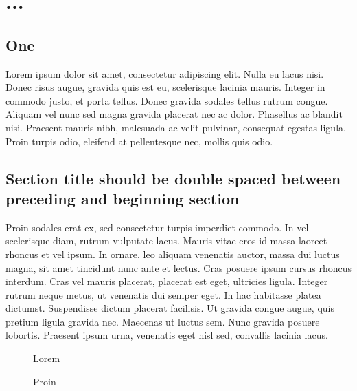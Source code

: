 \chapter{...}	%

\section{One}
Lorem ipsum dolor sit amet, consectetur adipiscing elit. Nulla eu lacus nisi. Donec risus augue, gravida quis est eu, scelerisque lacinia mauris. Integer in commodo justo, et porta tellus. Donec gravida sodales tellus rutrum congue. Aliquam vel nunc sed magna gravida placerat nec ac dolor. Phasellus ac blandit nisi. Praesent mauris nibh, malesuada ac velit pulvinar, consequat egestas ligula. Proin turpis odio, eleifend at pellentesque nec, mollis quis odio.

\section{Section title should be double spaced between preceding and beginning section}
Proin sodales erat ex, sed consectetur turpis imperdiet commodo. In vel scelerisque diam, rutrum vulputate lacus. Mauris vitae eros id massa laoreet rhoncus et vel ipsum. In ornare, leo aliquam venenatis auctor, massa dui luctus magna, sit amet tincidunt nunc ante et lectus. Cras posuere ipsum cursus rhoncus interdum. Cras vel mauris placerat, placerat est eget, ultricies ligula. Integer rutrum neque metus, ut venenatis dui semper eget. In hac habitasse platea dictumst. Suspendisse dictum placerat facilisis. Ut gravida congue augue, quis pretium ligula gravida nec. Maecenas ut luctus sem. Nunc gravida posuere lobortis. Praesent ipsum urna, venenatis eget nisl sed, convallis lacinia lacus.


\begin{figure}
	\centering
	 \caption[one]{Lorem}
\end{figure}

\begin{figure}
	\centering
	 \caption[two]{Proin}
\end{figure}

\endinput